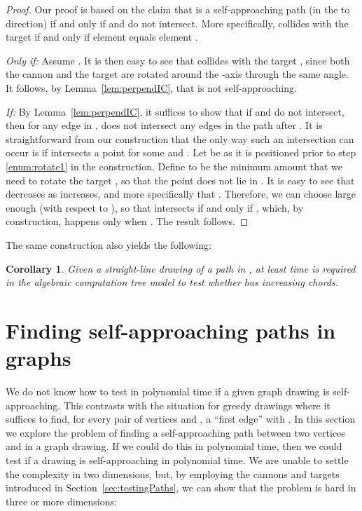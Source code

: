 \documentclass[11pt]{article}
\newtheorem{corollary}[theorem]{Corollary}
\newcommand{\changed}[1]{#1}
\newcommand{\ignore}[1]{}
\newcommand{\changedagain}[1]{{#1}}
\begin{document}
\begin{proof}
\changedagain{Our proof is based on the claim that  is} a self-approaching path (in the  to  direction) if and only if  and  do not intersect. More specifically,  collides with the target  if and only if element  equals element .

\emph{Only if:} Assume .  It is then easy to see that  collides with the target , since both the cannon  and the target  are rotated around the -axis through the same angle.  It follows, by Lemma~\ref{lem:perpendIC}, that  is not self-approaching.

\emph{If:} By Lemma~\ref{lem:perpendIC}, it suffices to show that if  and  do not intersect, then for any edge  in ,  does not intersect any edges in the path after . It is straightforward from our construction that the only way such an intersection can occur is if  intersects a point  for some  and .  Let  be  as it is positioned prior to step \ref{enum:rotate1} in the construction.
Define  to be the minimum amount that we need to rotate the target , so that the point  does not lie in . It is easy to see that  decreases as  increases, and more specifically that . Therefore, we can choose  large enough (with respect to ), so that  intersects  if and only if , which, by construction, happens only when .  The result follows.
\end{proof}

\ignore{To prove this, we build an embedding of a path in  using `cannons' and `targets', where a slab perpendicular to a `cannon' collides with a `target' if and only if the corresponding elements of the sets  and  are identical.}

The same construction also yields the following:
\begin{corollary}
Given a straight-line drawing of a path  in , at least  time is required in the algebraic computation tree model to test whether  has increasing chords.
\end{corollary}





\section{Finding self-approaching paths in graphs}
\label{sec:SAPathsInGraphs}

{\changed We do not know how to test in polynomial time if a given graph drawing is self-approaching.
This contrasts with the situation for greedy drawings where it suffices to find, for every pair of vertices  and , a ``first edge''  with .
In this section we explore the problem of finding a self-approaching path between two vertices  and  in a graph drawing.  If we could do this in polynomial time, then we could test if a drawing is self-approaching in polynomial time.
We are unable to settle the complexity in two dimensions, but,  by employing the cannons and targets introduced in Section~\ref{sec:testingPaths}, we can show that the problem is hard in three or more dimensions:}
\end{document}

